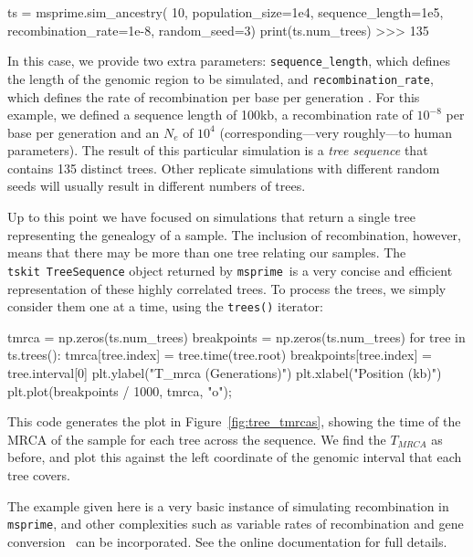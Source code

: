 \documentclass[graybox]{svmult}
\newcommand{\msprime}[0]{\texttt{msprime}}
\newcommand{\tskit}[0]{\texttt{tskit}}
\begin{document}
\begin{pythoncode}
ts = msprime.sim_ancestry(
    10, population_size=1e4, sequence_length=1e5,
    recombination_rate=1e-8, random_seed=3)
print(ts.num_trees)
>>> 135
\end{pythoncode}

In this case, we provide two extra parameters: \texttt{sequence\_length}, which
defines the length of the genomic region to be simulated, and
\texttt{recombination\_rate}, which defines the rate of recombination
per base per generation .
For this example, we defined a sequence length of 100kb, a recombination rate of
\(10^{-8}\) per base per generation and an $N_e$ of $10^4$ 
(corresponding---very roughly---to human parameters).
The result of this particular simulation is a
\emph{tree sequence} that contains 135 distinct trees. Other replicate
simulations with different random seeds will usually result in different
numbers of trees.

Up to this point we have focused on simulations that return a single
tree representing the genealogy of a sample. The inclusion of
recombination, however, means that there may be more than one tree
relating our samples. The \tskit\ \texttt{TreeSequence} object returned by
\msprime\ is a very concise and efficient representation of these highly
correlated trees. To process the trees, we simply consider
them one at a time, using the \texttt{trees()} iterator:

\begin{pythoncode}
tmrca = np.zeros(ts.num_trees)
breakpoints = np.zeros(ts.num_trees)
for tree in ts.trees():
    tmrca[tree.index] = tree.time(tree.root)
    breakpoints[tree.index] = tree.interval[0]
plt.ylabel("T_mrca (Generations)")
plt.xlabel("Position (kb)")
plt.plot(breakpoints / 1000, tmrca, "o");
\end{pythoncode}

This code generates the plot in Figure~\ref{fig:tree_tmrcas}, showing the time
of the MRCA of the sample for each tree across the sequence. We find the
\(T_{MRCA}\) as before, and plot this against the left coordinate of the
genomic interval that each tree covers. 

The example given here is a very basic instance of simulating
recombination in \msprime,  and other complexities such as 
variable rates of recombination and gene 
conversion~\citep{wiuf2000coalescent} can be incorporated. 
See the online documentation for full details.

\end{document}
